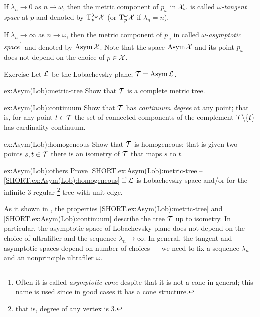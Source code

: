 If $\lambda_n\to 0$ as $n\to\omega$, then the metric component of $p_\omega$ in $\mathcal{X}_\omega$ is called \emph{$\omega$-tangent space} at $p$ and denoted by $\mathrm{T}_p^{\lambda_\omega}\mathcal{X}$ (or $\mathrm{T}_p^{\omega}\mathcal{X}$ if $\lambda_n=n$).\label{page:ultratangent space}

If $\lambda_n\to \infty$ as $n\to\omega$, then the metric component of $p_\omega$ in called \emph{$\omega$-asymptotic space}\footnote{Often it is called \emph{asymptotic cone} despite that it is not a cone in general; this name is used since in good cases it has a cone structure.}  and denoted by $\mathop{\rm Asym}\nolimits\mathcal{X}$.
Note that the space $\mathop{\rm Asym}\nolimits\mathcal{X}$ and its point $p_\omega$ does not depend on the choice of $p\in \mathcal{X}$.

\begin{thm}{Exercise}\label{ex:Asym(Lob)}
Let $\mathcal{L}$ be the Lobachevsky plane; $\mathcal{T}=\mathop{\rm Asym}\nolimits\mathcal{L}$.

\begin{subthm}{ex:Asym(Lob):metric-tree}
Show that $\mathcal{T}$ is a complete metric tree.
\end{subthm}

\begin{subthm}{ex:Asym(Lob):continuum}
Show that $\mathcal{T}$ has \emph{continuum degree} at any point;
that is, for any point $t\in \mathcal{T}$ the set of connected components of the complement $\mathcal{T}\backslash\{t\}$ has cardinality continuum.
\end{subthm}

\begin{subthm}{ex:Asym(Lob):homogeneous}
Show that $\mathcal{T}$ is homogeneous; that is given two points $s,t\in \mathcal{T}$ there is an isometry of $\mathcal{T}$ that maps $s$ to $t$.
\end{subthm}

\begin{subthm}{ex:Asym(Lob):others}
Prove \ref{SHORT.ex:Asym(Lob):metric-tree}--\ref{SHORT.ex:Asym(Lob):homogeneous} if $\mathcal{L}$ is Lobachevsky space and/or for the infinite 3-regular%
\footnote{that is, degree of any vertex is 3.}
tree with unit edge. 
\end{subthm}


\end{thm}

As it shown in \cite{dyubina-polterovich}, the properties \ref{SHORT.ex:Asym(Lob):metric-tree} and \ref{SHORT.ex:Asym(Lob):continuum} describe the tree $\mathcal{T}$ up to isometry.
In particular, the asymptotic space of Lobachevsky plane does not depend on the choice of ultrafilter and the sequence $\lambda_n\to \infty$.
In general, the tangent and asymptotic spaces depend on number of choices --- we need to fix a sequence $\lambda_n$ and an nonprinciple ultrafiler $\omega$.
